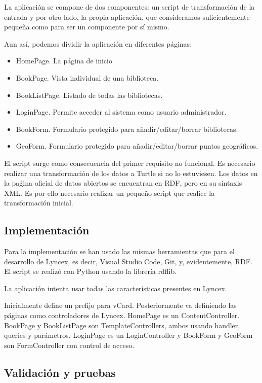 \documentclass[12pt]{report} %
\begin{document}
La aplicación se compone de dos componentes: un script de transformación de la entrada y por otro lado, la propia aplicación, que consideramos suficientemente pequeña como para ser un componente por sí mismo.

Aun así, podemos dividir la aplicación en diferentes páginas:
\begin{itemize}
    \item HomePage. La página de inicio
    \item BookPage. Vista individual de una biblioteca.
    \item BookListPage. Listado de todas las bibliotecas.
    \item LoginPage. Permite acceder al sistema como usuario administrador.
    \item BookForm. Formulario protegido para añadir/editar/borrar bibliotecas.
    \item GeoForm. Formulario protegido para añadir/editar/borrar puntos geográficos.
\end{itemize}

El script surge como consecuencia del primer requisito no funcional. Es necesario realizar una transformación de los datos a Turtle si no lo estuviesen. Los datos en la paǵina oficial de datos abiertos se encuentran en RDF, pero en su sintaxis XML. Es por ello necesario realizar un pequeño script que realice la transformación inicial.


\subsection{Implementación}

Para la implementación se han usado las mismas herramientas que para el desarrollo de Lyncex, es decir, Visual Studio Code, Git, y, evidentemente, RDF. El script se realizó con Python usando la librería rdflib.

La aplicación intenta usar todas las características presentes en Lyncex. 

Inicialmente define un prefijo para vCard. Posteriormente va definiendo las páginas como controladores de Lyncex. HomePage es un ContentController. BookPage y BookListPage son TemplateControllers, ambos usando handler, queries y parámetros. LoginPage es un LoginController y BookForm y GeoForm son FormController con control de acceso.

\subsection{Validación y pruebas} 
\end{document}

